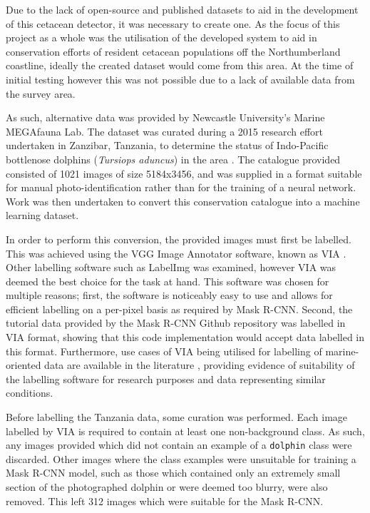 Due to the lack of open-source and published datasets to aid in the development of this cetacean detector, it was necessary to create one. As the focus of this project as a whole was the utilisation of the developed system to aid in conservation efforts of resident cetacean populations off the Northumberland coastline, ideally the created dataset would come from this area. At the time of initial testing however this was not possible due to a lack of available data from the survey area.

As such, alternative data was provided by Newcastle University's Marine MEGAfauna Lab. The dataset was curated during a 2015 research effort undertaken in Zanzibar, Tanzania, to determine the status of Indo-Pacific bottlenose dolphins (\textit{Tursiops aduncus}) in the area \cite{sharpe_indian_2019}. The catalogue provided consisted of 1021 images of size 5184x3456, and was supplied in a format suitable for manual photo-identification rather than for the training of a neural network. Work was then undertaken to convert this conservation catalogue into a machine learning dataset. 

In order to perform this conversion, the provided images must first be labelled. This was achieved using the VGG Image Annotator software, known as VIA \cite{dutta_via_2019}. Other labelling software such as LabelImg \cite{tzutalin_labelimg_2021} was examined, however VIA was deemed the best choice for the task at hand. This software was chosen for multiple reasons; first, the software is noticeably easy to use and allows for efficient labelling on a per-pixel basis as required by Mask R-CNN. Second, the tutorial data provided by the Mask R-CNN Github repository was labelled in VIA format, showing that this code implementation would accept data labelled in this format. Furthermore, use cases of VIA being utilised for labelling of marine-oriented data are available in the literature \cite{nita_cnn-based_2020}, providing evidence of suitability of the labelling software for research purposes and data representing similar conditions.

Before labelling the Tanzania data, some curation was performed. Each image labelled by VIA is required to contain at least one non-background class. As such, any images provided which did not contain an example of a \texttt{dolphin} class were discarded. Other images where the class examples were unsuitable for training a Mask R-CNN model, such as those which contained only an extremely small section of the photographed dolphin or were deemed too blurry, were also removed. This left 312 images which were suitable for the Mask R-CNN.

